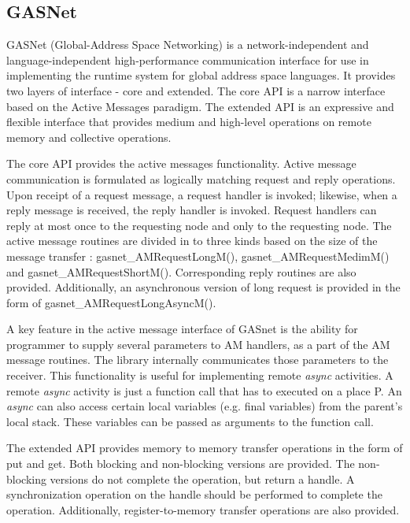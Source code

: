 \subsection {GASNet } 

GASNet (Global-Address Space Networking) is a network-independent and language-independent high-performance communication 
interface for use in implementing the runtime system for global address space languages. It provides
two layers of interface - core and extended. The core API is a narrow interface
based on the Active Messages paradigm. The extended API is an expressive
and flexible interface that provides medium and high-level operations on remote
memory and collective operations. 

The core API provides the active messages functionality. Active message communication is formulated as logically matching request and reply operations. Upon receipt of a request message, a request handler is invoked; likewise, when a reply message is received, the reply handler is invoked. Request handlers can reply at most once to the requesting node and only to the requesting node.
 The active message routines are divided in to three kinds based on the size of the message transfer : gasnet\_AMRequestLongM(), gasnet\_AMRequestMedimM() and
gasnet\_AMRequestShortM(). Corresponding reply routines are also provided. Additionally, an asynchronous version of long request is provided in the
form of gasnet\_AMRequestLongAsyncM().

A key feature in
the active message interface of GASnet is the ability for programmer to
supply several parameters to AM handlers, as  a part of the
AM message routines. The library internally communicates those
parameters to the receiver. This functionality is useful for 
implementing remote {\em async} activities. A remote {\em async} activity is just
a function call that has to executed on a place P. An {\em async} can also
access certain local variables (e.g. final variables) from the parent's
local stack. These variables can be passed as arguments to the function call.

The extended API provides memory to memory transfer operations in the form
of put and get. Both blocking and non-blocking versions are provided. The non-blocking versions do not complete the operation, but return a handle. A synchronization operation on the handle should be performed to complete the operation.
Additionally, register-to-memory transfer operations are also provided. 
